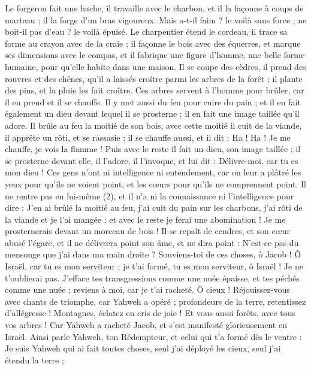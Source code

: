 \begin{multicols}{2}
{Le forgeron fait une hache, il travaille avec le charbon, et il la façonne à coups de marteau ; il la forge d’un bras vigoureux. Mais a-t-il faim ? le voilà sans force ; ne boit-il pas d’eau ? le voilà épuisé.
Le charpentier étend le cordeau, il trace sa forme au crayon avec de la craie ; il façonne le bois avec des équerres, et marque ses dimensions avec le compas, et il fabrique une figure d’homme, une belle forme humaine, pour qu’elle habite dans une maison.
Il se coupe des cèdres, il prend des rouvres et des chênes, qu'il a laissés croître parmi les arbres de la forêt ; il plante des pins, et la pluie les fait croître.
Ces arbres servent à l'homme pour brûler, car il en prend et il se chauffe. Il y met aussi du feu pour cuire du pain ; et il en fait également un dieu devant lequel il se prosterne ; il en fait une image taillée qu’il adore.
Il brûle au feu la moitié de son bois, avec cette moitié il cuit de la viande, il apprête un rôti, et se rassasie ; il se chauffe aussi, et il dit : Ha ! Ha ! Je me chauffe, je vois la flamme !
Puis avec le reste il fait un dieu, son image taillée ; il se prosterne devant elle, il l’adore, il l’invoque, et lui dit : Délivre-moi, car tu es mon dieu !
Ces gens n’ont ni intelligence ni entendement, car on leur a plâtré les yeux pour qu'ils ne voient point, et les cœurs pour qu'ils ne comprennent point.
Il ne rentre pas en lui-même (2), et il n’a ni la connaissance ni l’intelligence pour dire : J’en ai brûlé la moitié au feu, j’ai cuit du pain sur les charbons, j’ai rôti de la viande et je l’ai mangée ; et avec le reste je ferai une abomination ! Je me prosternerais devant un morceau de bois !
Il se repaît de cendres, et son cœur abusé l’égare, et il ne délivrera point son âme, et ne dira point : N’est-ce pas du mensonge que j’ai dans ma main droite ?
Souviens-toi de ces choses, ô Jacob ! Ô Israël, car tu es mon serviteur ; je t'ai formé, tu es mon serviteur, ô Israël ! Je ne t’oublierai pas.
J'efface tes transgressions comme une nuée épaisse, et tes péchés comme une nuée ; reviens à moi, car je t'ai racheté.
Ô cieux ! Réjouissez-vous avec chants de triomphe, car Yahweh a opéré ; profondeurs de la terre, retentissez d’allégresse ! Montagnes, éclatez en cris de joie ! Et vous aussi forêts, avec tous vos arbres ! Car Yahweh a racheté Jacob, et s'est manifesté glorieusement en Israël.
Ainsi parle Yahweh, ton Rédempteur, et celui qui t'a formé dès le ventre : Je suis Yahweh qui ai fait toutes choses, seul j’ai déployé les cieux, seul j’ai étendu la terre ;
}
\end{multicols}
